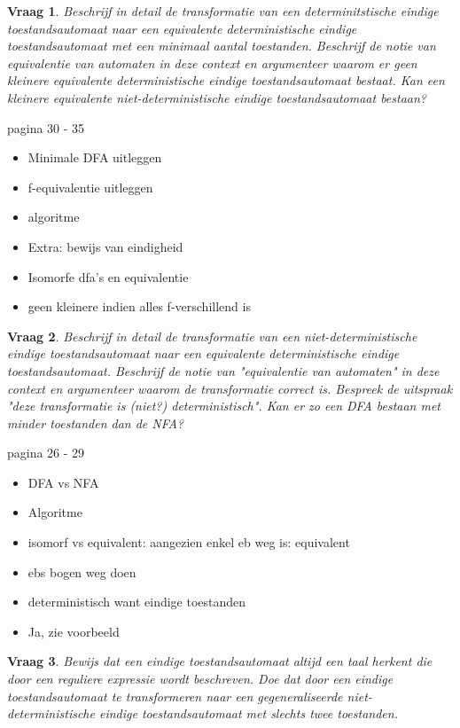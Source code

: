 \documentclass[10pt,a4paper]{article}
\newtheorem{qtext}{Vraag}
\newenvironment{question}{\newpage\begin{qbox}\begin{qtext}}{\end{qtext}\end{qbox}}
\begin{document}
\begin{question}
	Beschrijf in detail de transformatie van een determinitstische eindige toestandsautomaat naar een equivalente deterministische eindige toestandsautomaat met een minimaal aantal toestanden. Beschrijf de notie van equivalentie van automaten in deze context en argumenteer waarom er geen kleinere equivalente deterministische eindige toestandsautomaat bestaat. Kan een kleinere equivalente niet-deterministische eindige toestandsautomaat bestaan?
\end{question}

pagina 30 - 35
\begin{itemize}
	\item Minimale DFA uitleggen
	\item f-equivalentie uitleggen
	\item algoritme
	\item Extra: bewijs van eindigheid
	\item Isomorfe dfa's en equivalentie
	\item geen kleinere indien alles f-verschillend is
\end{itemize}

\newpage

\begin{question}
	Beschrijf in detail de transformatie van een niet-deterministische eindige toestandsautomaat naar een equivalente deterministische eindige toestandsautomaat. Beschrijf de notie van "equivalentie van automaten" in deze context en argumenteer waarom de transformatie correct is. Bespreek de uitspraak "deze transformatie is (niet?) deterministisch". Kan er zo een DFA bestaan met minder toestanden dan de NFA?
\end{question}

pagina 26 - 29
\begin{itemize}
	\item DFA vs NFA
	\item Algoritme
	\item isomorf vs equivalent: aangezien enkel eb weg is: equivalent
	\item ebs bogen weg doen
	\item deterministisch want eindige toestanden
	\item Ja, zie voorbeeld
\end{itemize}

\newpage

\begin{question}
	Bewijs dat een eindige toestandsautomaat altijd een taal herkent die door een reguliere expressie wordt beschreven. Doe dat door een eindige toestandsautomaat te transformeren naar een gegeneraliseerde niet-deterministische eindige toestandsautomaat met slechts twee toestanden.
\end{question}
\end{document}
